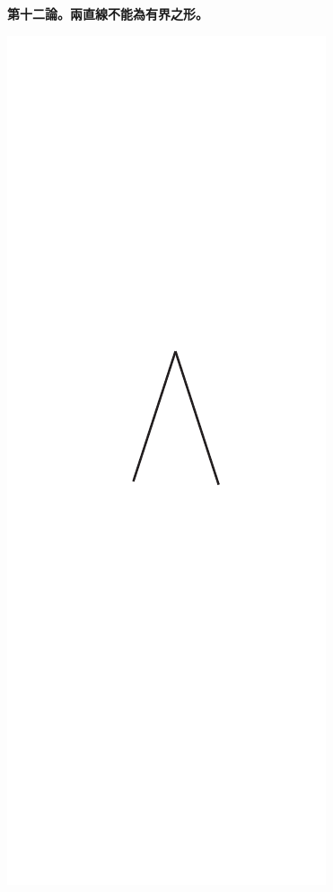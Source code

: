 \documentclass[12pt,b5paper,landscape]{article}
\newcommand{\cthm}[1]{{
\vspace{8pt}

\bfseries #1}}
\begin{document}
\begin{multicols}{2}
\cthm{第十二論。兩直線不能為有界之形。}
\begin{center}
\includegraphics[angle=90]{eu30}
\end{center}


\end{multicols}
\end{document}
